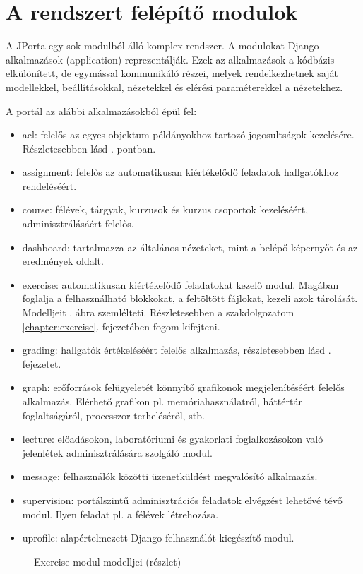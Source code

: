 \section{A rendszert felépítő modulok}

A JPorta egy sok modulból álló komplex rendszer. A modulokat Django alkalmazások (application) reprezentálják. Ezek az alkalmazások a kódbázis elkülönített, de egymással kommunikáló részei, melyek rendelkezhetnek saját modellekkel, beállításokkal, nézetekkel és elérési paraméterekkel a nézetekhez. \cite{DjangoApp}

A portál az alábbi alkalmazásokból épül fel:
\begin{itemize}
    \item acl: felelős az egyes objektum példányokhoz tartozó jogosultságok kezelésére. Részletesebben lásd . pontban.
    \item assignment: felelős az automatikusan kiértékelődő feladatok hallgatókhoz rendeléséért.
    \item course: félévek, tárgyak, kurzusok és kurzus csoportok kezeléséért, adminisztrálásáért felelős.
    \item dashboard: tartalmazza az általános nézeteket, mint a belépő képernyőt és az eredmények oldalt.
    \item exercise: automatikusan kiértékelődő feladatokat kezelő modul. Magában foglalja a felhasználható blokkokat, a feltöltött fájlokat, kezeli azok tárolását. Modelljeit . ábra szemlélteti. Részletesebben a szakdolgozatom \ref{chapter:exercise}. fejezetében fogom kifejteni.
    \item grading: hallgatók értékeléséért felelős alkalmazás, részletesebben lásd . fejezetet.
    \item graph: erőforrások felügyeletét könnyítő grafikonok megjelenítéséért felelős alkalmazás. Elérhető grafikon pl. memóriahasználatról, háttértár foglaltságáról, processzor terheléséről, stb.
    \item lecture: előadásokon, laboratóriumi és gyakorlati foglalkozásokon való jelenlétek adminisztrálására szolgáló modul.
    \item message: felhasználók közötti üzenetküldést megvalósító alkalmazás.
    \item supervision: portálszintű adminisztrációs feladatok elvégzést lehetővé tévő modul. Ilyen feladat pl. a félévek létrehozása.
    \item uprofile: alapértelmezett Django felhasználót kiegészítő modul.
\end{itemize}

\begin{figure}[h]
    \centering
    \caption{Exercise modul modelljei (részlet)}
    \label{fig:jporta_exercie_modules}
\end{figure}